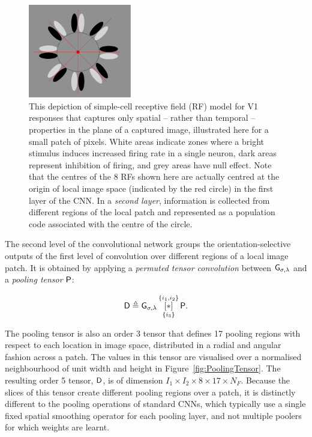 \begin{figure}
\begin{center}
\includegraphics[width=4.5cm]{gfx/Chapter05/OrientedGabors.pdf}
\caption{This depiction of simple\--cell receptive field (RF) model for V1 responses that captures only spatial -- rather than temporal -- properties in the plane of a captured image, illustrated here for a small patch of pixels. White areas indicate zones where a bright stimulus induces increased firing rate in a single neuron, dark areas represent inhibition of firing, and grey areas have null effect.  Note that the centres of the 8 RFs shown here are actually centred at the origin of local image space (indicated by the red circle) in the first layer of the CNN.  In a {\em second layer}, information is collected from different regions of the local patch and represented as a population code associated with the centre of the circle.}
\label{fig:OG}
\end{center}
\end{figure}

The second level of the convolutional network groups the orientation-selective outputs of the first level of convolution over different regions of a local image patch. It is obtained by applying a \textit{permuted tensor convolution} between $\mathsf{G}_{\sigma,\lambda}$ and a \textit{pooling tensor} $\mathsf{P}$:  

\begin{equation}
\mathsf{D} \triangleq \mathsf{G}_{\sigma,\lambda} \, 
   \underset{\lbrace i_3 \rbrace}{\overset{\lbrace i_1,i_2\rbrace}{[ \ast ]}}\, {\mathsf{P}}.
\end{equation}

The pooling tensor is also an order 3 tensor that defines 17 pooling regions with respect to each location in image space, distributed in a radial and angular fashion across a patch. The values in this tensor are visualised over a normalised neighbourhood of unit width and height in Figure~\ref{fig:PoolingTensor}. The resulting order 5 tensor, $\mathsf{D}$, is of dimension $I_1\times I_2 \times 8 \times 17 \times N_F$. Because the slices of this tensor create different pooling regions over a patch, it is distinctly different to the pooling operations of standard CNNs, which typically use a single fixed spatial smoothing operator for each pooling layer, and not multiple poolers for which weights are learnt. 


